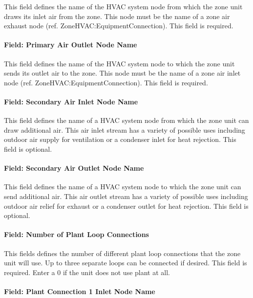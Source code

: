This field defines the name of the HVAC system node from which the zone unit draws its inlet air from the zone. This node must be the name of a zone air exhaust node (ref. ZoneHVAC:EquipmentConnection). This field is required.

\paragraph{Field: Primary Air Outlet Node Name}\label{field-primary-air-outlet-node-name-001}

This field defines the name of the HVAC system node to which the zone unit sends its outlet air to the zone. This node must be the name of a zone air inlet node (ref. ZoneHVAC:EquipmentConnection). This field is required.

\paragraph{Field: Secondary Air Inlet Node Name}\label{field-secondary-air-inlet-node-name-002}

This field defines the name of a HVAC system node from which the zone unit can draw additional air. This air inlet stream has a variety of possible uses including outdoor air supply for ventilation or a condenser inlet for heat rejection. This field is optional.

\paragraph{Field: Secondary Air Outlet Node Name}\label{field-secondary-air-outlet-node-name-001}

This field defines the name of a HVAC system node to which the zone unit can send additional air. This air outlet stream has a variety of possible uses including outdoor air relief for exhaust or a condenser outlet for heat rejection. This field is optional.

\paragraph{Field: Number of Plant Loop Connections}\label{field-number-of-plant-loop-connections}

This fields defines the number of different plant loop connections that the zone unit will use. Up to three separate loops can be connected if desired. This field is required. Enter a 0 if the unit does not use plant at all.

\paragraph{Field: Plant Connection 1 Inlet Node Name}\label{field-plant-connection-1-inlet-node-name}

